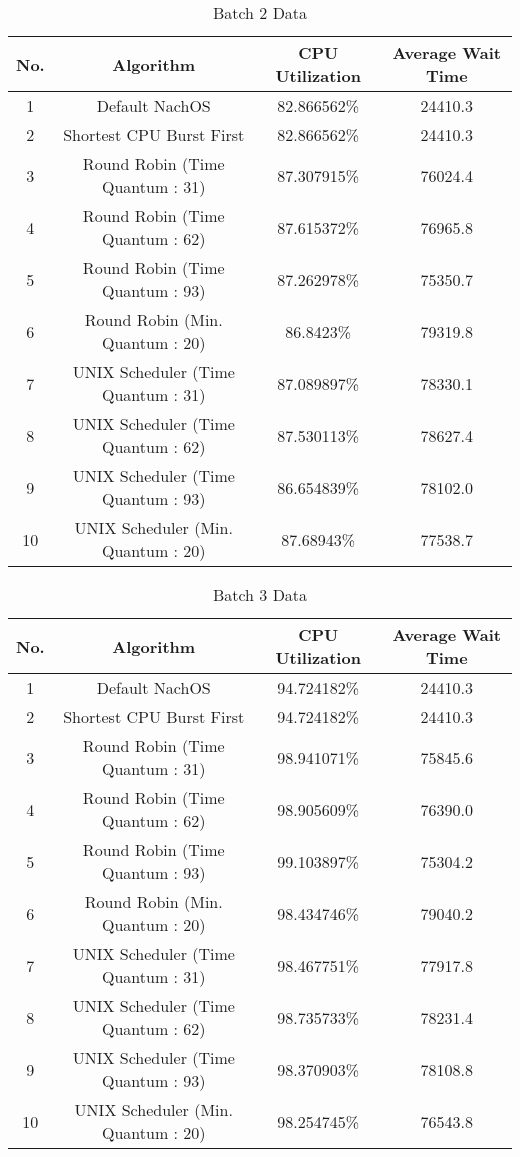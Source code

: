 \documentclass{article}
\begin{document}
	\begin{table}[!htb]
		\caption{Batch 2 Data}
		\begin{tabular}{ |c|c|c|c| }
			\hline
			\textbf{No.} & \textbf{Algorithm} & \textbf{CPU Utilization} & \textbf{Average Wait Time} \\ \hline
			1	&	Default	NachOS	&				82.866562\%	&	24410.3	\\	\hline
			2	&	Shortest	CPU	Burst	First	&		82.866562\%	&	24410.3	\\	\hline
			3	&	Round	Robin	(Time	Quantum	:	31)&	87.307915\%	&	76024.4	\\	\hline
			4	&	Round	Robin	(Time	Quantum	:	62)&	87.615372\%	&	76965.8	\\	\hline
			5	&	Round	Robin	(Time	Quantum	:	93)&	87.262978\%	&	75350.7	\\	\hline
			6	&	Round	Robin	(Min.	Quantum	:	20)&	86.8423\%	&	79319.8	\\	\hline
			7	&	UNIX	Scheduler	(Time	Quantum	:	31)&	87.089897\%	&	78330.1	\\	\hline
			8	&	UNIX	Scheduler	(Time	Quantum	:	62)&	87.530113\%	&	78627.4	\\	\hline
			9	&	UNIX	Scheduler	(Time	Quantum	:	93)&	86.654839\%	&	78102.0	\\	\hline
			10	&	UNIX	Scheduler	(Min.	Quantum	:	20)&	87.68943\%	&	77538.7	\\	\hline
				
		\end{tabular}
		
	\end{table}


	\begin{table}[!htb]
		\caption{Batch 3 Data}
		\begin{tabular}{ |c|c|c|c| }
			\hline
			\textbf{No.} & \textbf{Algorithm} & \textbf{CPU Utilization} & \textbf{Average Wait Time} \\ \hline
			1	&	Default	NachOS					&	    94.724182\%	&	24410.3	\\	\hline
			2	&	Shortest	CPU	Burst	First	&		94.724182\%	&	24410.3	\\	\hline
			3	&	Round	Robin	(Time	Quantum	:	31)&	98.941071\%	&	75845.6	\\	\hline
			4	&	Round	Robin	(Time	Quantum	:	62)&	98.905609\%	&	76390.0	\\	\hline
			5	&	Round	Robin	(Time	Quantum	:	93)&	99.103897\%	&	75304.2	\\	\hline
			6	&	Round	Robin	(Min.	Quantum	:	20)&	98.434746\%	&	79040.2	\\	\hline
			7	&	UNIX	Scheduler	(Time	Quantum	:	31)&	98.467751\%	&	77917.8	\\	\hline
			8	&	UNIX	Scheduler	(Time	Quantum	:	62)&	98.735733\%	&	78231.4	\\	\hline
			9	&	UNIX	Scheduler	(Time	Quantum	:	93)&	98.370903\%	&	78108.8	\\	\hline
			10	&	UNIX	Scheduler	(Min.	Quantum	:	20)&	98.254745\%	&	76543.8	\\	\hline
			
		\end{tabular}
	
	\end{table}
\end{document}
